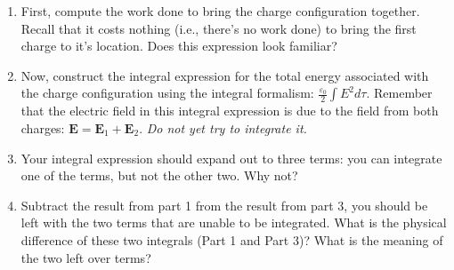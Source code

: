 \documentclass[11pt]{article}
\def\tightlist{}
\begin{document}
\begin{enumerate}
\def\labelenumi{\arabic{enumi}.}
\tightlist
\item
  First, compute the work done to bring the charge configuration
  together. Recall that it costs nothing (i.e., there's no work done) to
  bring the first charge to it's location. Does this expression look
  familiar?
\item
  Now, construct the integral expression for the total energy associated
  with the charge configuration using the integral formalism:
  \(\frac{\varepsilon_0}{2} \int E^2 d\tau\). Remember that the electric
  field in this integral expression is due to the field from both
  charges: \(\mathbf{E} = \mathbf{E}_1 + \mathbf{E}_2\). \emph{Do not
  yet try to integrate it.}
\item
  Your integral expression should expand out to three terms: you can
  integrate one of the terms, but not the other two. Why not?
\item
  Subtract the result from part 1 from the result from part 3, you
  should be left with the two terms that are unable to be integrated.
  What is the physical difference of these two integrals (Part 1 and
  Part 3)? What is the meaning of the two left over terms?
\end{enumerate}
\end{document}
